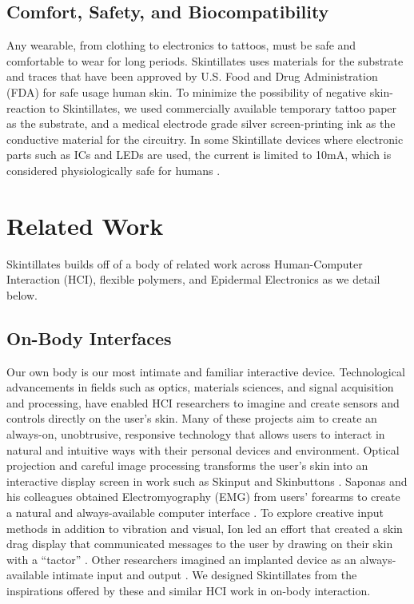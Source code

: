 \documentclass{sigchi}
\begin{document}
\subsection{Comfort, Safety, and Biocompatibility}
Any wearable, from clothing to electronics to tattoos, must be safe and comfortable to wear for long periods.  Skintillates uses materials for the substrate and traces that have been approved by U.S. Food and Drug Administration (FDA) for safe usage human skin. To minimize the possibility of negative skin-reaction to Skintillates, we used commercially available temporary tattoo paper as the substrate, and a medical electrode grade silver screen-printing ink as the conductive material for the circuitry\cite{Anonymous:6vWXbuD5,Cristea:2009uq,Rattfalt:2013ts}. In some Skintillate devices where electronic parts such as ICs and LEDs are used, the current is limited to 10mA, which is considered physiologically safe for humans \cite{Scherz:_BfVY1Mg}. 

\section{Related Work}
Skintillates builds off of a body of related work across Human-Computer Interaction (HCI), flexible polymers, and Epidermal Electronics as we detail below.
\subsection{On-Body Interfaces}
Our own body is our most intimate and familiar interactive device. Technological advancements in fields such as optics, materials sciences, and signal acquisition and processing, have enabled HCI researchers to imagine and create sensors and controls directly on the user’s skin. Many of these projects aim to create an always-on, unobtrusive, responsive technology that allows users to interact in natural and intuitive ways with their personal devices and environment. Optical projection and careful image processing transforms the user’s skin into an interactive display  screen  in  work  such   as   Skinput   and Skinbuttons \cite{ChrisHarrison:2010vi, Laput:2014du}. Saponas and his colleagues obtained Electromyography (EMG) from users’ forearms to create a natural and always-available computer interface \cite{Anonymous:2009ua}. To explore creative input methods in addition to vibration and visual, Ion led an effort that created a skin drag display that communicated messages to the user by drawing  on their skin with a ``tactor'' \cite{Ion:2015ig}. Other researchers imagined an implanted device as an always-available intimate input and output \cite{Holz:2012ti}. We designed Skintillates from the inspirations offered by these and similar HCI work in on-body interaction.
\end{document}
